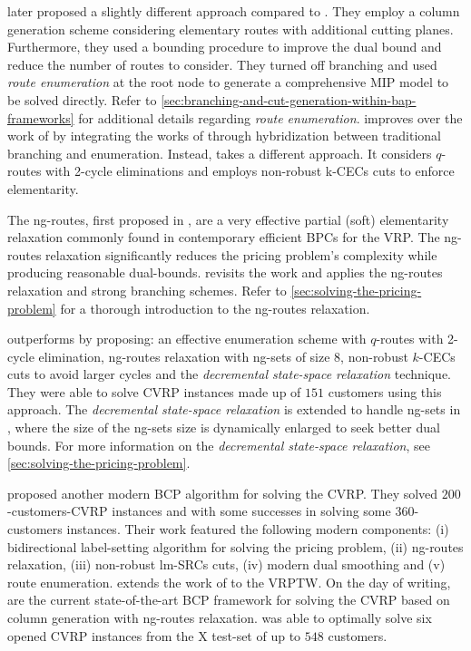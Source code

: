 \Textcite{baldacci2008} later proposed a slightly different approach compared to \textcite{fukasawa2006}.
They employ a column generation scheme considering elementary routes
with additional cutting planes.
Furthermore, they used a bounding procedure to improve the dual bound
and reduce the number of routes to consider.
They turned off branching and used \textit{route enumeration}
at the root node to generate a comprehensive MIP model to be solved directly.
Refer to \cref{sec:branching-and-cut-generation-within-bap-frameworks} for additional details
regarding \textit{route enumeration}.
\textcite{pessoa2008} improves over the work of \textcite{fukasawa2006}
by integrating the works of \textcite{fukasawa2006, baldacci2008}
through hybridization between traditional branching and enumeration.
Instead, \textcite{contardo2011} takes a different approach.
It considers $q$-routes with 2-cycle eliminations and employs non-robust k-CECs cuts
to enforce elementarity.

The ng-routes, first proposed in \textcite{baldacci2011},
are a very effective partial (soft) elementarity relaxation
commonly found in contemporary efficient BPCs for the VRP.
The ng-routes relaxation significantly reduces the pricing problem's complexity
while producing reasonable dual-bounds.
\textcite{ropke2012} revisits the work \citeauthor{fukasawa2006}
and applies the ng-routes relaxation and strong branching schemes.
Refer to \cref{sec:solving-the-pricing-problem} for a thorough introduction to the ng-routes relaxation.

\Textcite{contardo2014} outperforms \textcite{contardo2011}
by proposing: an effective enumeration scheme with
$q$-routes with 2-cycle elimination, ng-routes relaxation with ng-sets of size $8$,
non-robust $k$-CECs cuts to avoid larger cycles
and the \textit{decremental state-space relaxation} technique.
They were able to solve CVRP instances made up of $151$ customers using this approach.
The \textit{decremental state-space relaxation} is extended to handle ng-sets in \textcite{martinelli2014},
where the size of the ng-sets size is dynamically enlarged to seek better dual bounds.
For more information on the \textit{decremental state-space relaxation},
see \cref{sec:solving-the-pricing-problem}.

\Textcite{pecin2017improved} proposed another modern BCP algorithm for solving the CVRP.
They solved $200$-customers-CVRP instances and with some successes in solving some $360$-customers instances.
Their work featured the following modern components:
(i) bidirectional label-setting algorithm for solving the pricing problem,
(ii) ng-routes relaxation,
(iii) non-robust lm-SRCs cuts,
(iv) modern dual smoothing
and (v) route enumeration.
\Textcite{pecin2017new} extends the work of \textcite{pecin2017improved} to the VRPTW.
On the day of writing, \textcite{pessoa2018enhanced, pessoa2020generic}
are the current state-of-the-art BCP framework for solving the CVRP
based on column generation with ng-routes relaxation.
\Textcite{pessoa2020generic} was able to optimally solve six opened CVRP instances
from the X test-set \parencite{uchoa2017} of up to $548$ customers.

